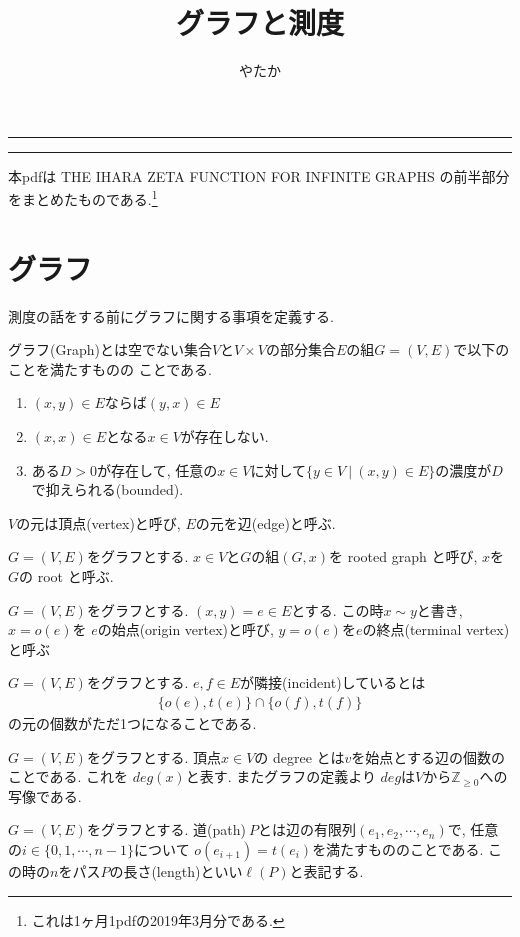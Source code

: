 \documentclass[11pt, a4paper, dvipdfmx]{jsarticle}
\title{グラフと測度}
\author{やたか}
\date{}
\makeatletter
\theoremstyle{definition}
\newtheorem*[S]{Definition+}[Axiom+]{Definition}
\newtheorem[S]{Theorem+}[Axiom+]{Theorem}
\newtheorem[S]{Proposition+}[Axiom+]{Proposition}
\newtheorem[S]{newch+}{Newcharactor}
\newcommand{\Z}{\mathbb{Z}}
\renewcommand{\maketitle}{\begin{titlepage}%
    \let\footnotesize\small
    \let\footnoterule\relax
    \parindent \z@
    \reset@font
    \null\vfil
    \hrule height 4pt
    \vskip 10\p@
      \LARGE 
      \strut \@title \par
    \begin{flushright}
      \vskip 30\p@
      \strut \@author
    \end{flushright}
    \vskip 5\p@
    \hrule height 4pt
    \vfil
    \begin{flushright}
        {\small \@date}%
    \end{flushright}
  \end{titlepage}%
  \setcounter{footnote}{0}%
}
\makeatother
\begin{document}
\maketitle
本pdfは THE IHARA ZETA FUNCTION FOR INFINITE GRAPHS の前半部分をまとめたものである.\footnote{これは1ヶ月1pdfの2019年3月分である.}
\tableofcontents
\section{グラフ}
測度の話をする前にグラフに関する事項を定義する.
\begin{Definition+}[グラフ]
    グラフ(Graph)とは空でない集合$V$と$V\times V$の部分集合$E$の組$G = (V, E)$で以下のことを満たすものの
    ことである. 
    \begin{enumerate}
        \item $(x, y)\in E$ならば$(y, x)\in E$
        \item $(x, x)\in E$となる$x\in V$が存在しない.
        \item ある$D >0$が存在して, 任意の$x\in V$に対して$\{y\in V ~|~ (x, y)\in E\}$の濃度が$D$で抑えられる(bounded).
    \end{enumerate}
    $V$の元は頂点(vertex)と呼び, $E$の元を辺(edge)と呼ぶ.
\end{Definition+}
\begin{Definition+}
    $G = (V, E)$をグラフとする. $x\in V$と$G$の組$(G, x)$を rooted graph と呼び, $x$を$G$の root と呼ぶ.
\end{Definition+}
\begin{Definition+}[始点と終点]
    $G = (V, E)$をグラフとする. $(x, y) = e\in E$とする. この時$x\sim y$と書き, $x = o(e)$を
    $e$の始点(origin vertex)と呼び, $y = o(e)$を$e$の終点(terminal vertex)と呼ぶ
\end{Definition+}
\newpage
\begin{Definition+}[隣接]
    $G = (V, E)$をグラフとする. $e, f\in E$が隣接(incident)しているとは
    \begin{align*}
        \{o(e), t(e)\}\cap \{o(f), t(f)\}
    \end{align*}
    の元の個数がただ1つになることである.
\end{Definition+}
\begin{Definition+}[degree]
    $G = (V, E)$をグラフとする. 頂点$x\in V$の degree とは$v$を始点とする辺の個数のことである. これを
    $deg(x)$と表す. またグラフの定義より $deg$は$V$から$\Z_{\geq 0}$への写像である. 
\end{Definition+}
\begin{Definition+}[道と長さ]
    $G = (V, E)$をグラフとする. 道(path)$~P$とは辺の有限列$(e_{1}, e_{2}, \cdots, e_{n})$で, 任意の$i\in\{0, 1, \cdots, n-1\}$について
    $o(e_{i + 1}) = t(e_{i})$を満たすもののことである. この時の$n$をパス$P$の長さ(length)といい$\ell(P)$と表記する.
\end{Definition+}
\end{document}
